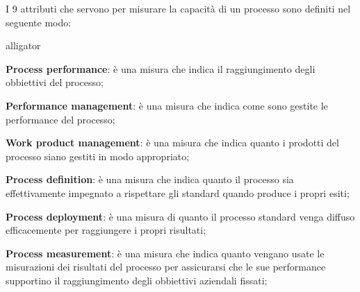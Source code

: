 I 9 attributi che servono per misurare la capacità di un processo sono definiti nel seguente modo:
\begin{labeling}{alligator}
	\item \textbf{Process performance}:  è una misura che indica il raggiungimento degli obbiettivi del processo;
	
	\item \textbf{Performance management}: è una misura che indica come sono gestite le performance del processo;%
	\item \textbf{Work product management}: è una misura che indica quanto i prodotti del processo siano gestiti in modo appropriato;
	
	\item \textbf{Process definition}: è una misura che indica quanto il processo sia effettivamente impegnato a rispettare gli standard quando produce i propri esiti;
	
	\item \textbf{Process deployment}: è una misura di quanto il processo standard venga diffuso efficacemente per raggiungere i propri risultati;%
	\item \textbf{Process measurement}:  è una misura che indica quanto vengano usate le misurazioni dei risultati  del processo per assicurarsi che le sue  performance supportino il raggiungimento degli obbiettivi aziendali fissati;
	

\end{labeling}
